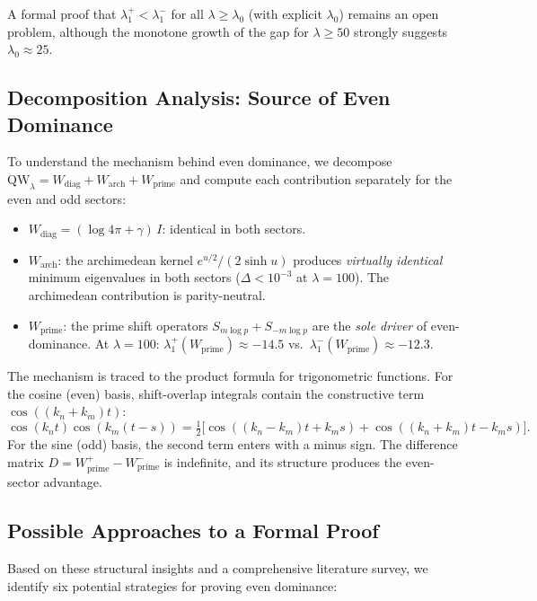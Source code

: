 \documentclass[12pt,a4paper]{article}
\theoremstyle{definition}
\theoremstyle{remark}
\begin{document}
A formal proof that $\lambda_1^+ < \lambda_1^-$ for all $\lambda \geq \lambda_0$ (with explicit $\lambda_0$) remains an open problem, although the monotone growth of the gap for $\lambda \geq 50$ strongly suggests $\lambda_0 \approx 25$.

\subsection{Decomposition Analysis: Source of Even Dominance}

To understand the mechanism behind even dominance, we decompose $\mathrm{QW}_\lambda = W_{\mathrm{diag}} + W_{\mathrm{arch}} + W_{\mathrm{prime}}$ and compute each contribution separately for the even and odd sectors:

\begin{itemize}
  \item $W_{\mathrm{diag}} = (\log 4\pi + \gamma)\,I$: identical in both sectors.
  \item $W_{\mathrm{arch}}$: the archimedean kernel $e^{u/2}/(2\sinh u)$ produces \emph{virtually identical} minimum eigenvalues in both sectors ($\Delta < 10^{-3}$ at $\lambda = 100$). The archimedean contribution is parity-neutral.
  \item $W_{\mathrm{prime}}$: the prime shift operators $S_{m\log p} + S_{-m\log p}$ are the \emph{sole driver} of even-dominance. At $\lambda = 100$: $\lambda_1^+(W_{\mathrm{prime}}) \approx -14.5$ vs.\ $\lambda_1^-(W_{\mathrm{prime}}) \approx -12.3$.
\end{itemize}

The mechanism is traced to the product formula for trigonometric functions. For the cosine (even) basis, shift-overlap integrals contain the constructive term $\cos((k_n + k_m)t)$:
\[
  \cos(k_n t)\cos(k_m(t-s)) = \tfrac{1}{2}\bigl[\cos((k_n-k_m)t + k_m s) + \cos((k_n+k_m)t - k_m s)\bigr].
\]
For the sine (odd) basis, the second term enters with a minus sign. The difference matrix $D = W_{\mathrm{prime}}^+ - W_{\mathrm{prime}}^-$ is indefinite, and its structure produces the even-sector advantage.

\subsection{Possible Approaches to a Formal Proof}

Based on these structural insights and a comprehensive literature survey, we identify six potential strategies for proving even dominance:
\end{document}
